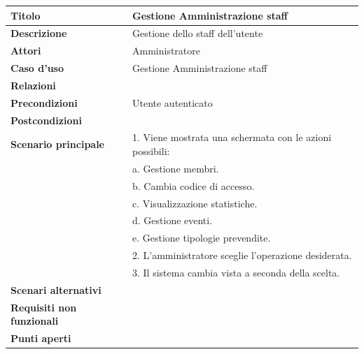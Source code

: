 \documentclass[a4paper]{article}
\begin{document}
\begin{center}
\begin{tabularx}{1\textwidth}{|l|X|}
   \hline
	\textbf{Titolo} & Gestione Amministrazione staff \\
	\hline
	\textbf{Descrizione} & Gestione dello staff dell'utente \\
	\hline
	\textbf{Attori} & Amministratore \\
	\hline
	\textbf{Caso d'uso} & Gestione Amministrazione staff \\
	\hline
	\textbf{Relazioni} &  \\
	\hline
	\textbf{Precondizioni} & Utente autenticato \\
	\hline
	\textbf{Postcondizioni} & \\
	\hline
	\textbf{Scenario principale} & 1. Viene mostrata una schermata con le azioni possibili:\\
								 & \quad a. Gestione membri.\\
								 & \quad b. Cambia codice di accesso.\\
								 & \quad c. Visualizzazione statistiche.\\
								 & \quad d. Gestione eventi.\\
								 & \quad e. Gestione tipologie prevendite.\\
								 & 2. L'amministratore sceglie l'operazione desiderata.\\
								 & 3. Il sistema cambia vista a seconda della scelta.\\
	\hline
	\textbf{Scenari alternativi} & \\
	\hline
	\textbf{Requisiti non funzionali} & \\
	\hline
	\textbf{Punti aperti} & \\
	\hline
\end{tabularx}
\end{center}

\end{document}
